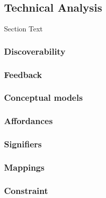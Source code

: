 

\subsection{Technical Analysis}
\bigskip
Section Text

\subsubsection{Discoverability}
\medskip

\subsubsection{Feedback}
\medskip

\subsubsection{Conceptual models}
\medskip

\subsubsection{Affordances}
\medskip

\subsubsection{Signifiers}
\medskip

\subsubsection{Mappings}
\medskip


\subsubsection{Constraint }











